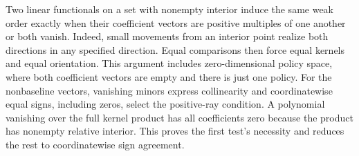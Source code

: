 \documentclass[11pt,a4paper]{amsart}
\begin{document}
Two linear functionals on a set with nonempty interior induce the same weak order exactly when their coefficient vectors are positive multiples of one another or both vanish. Indeed, small movements from an interior point realize both directions in any specified direction. Equal comparisons then force equal kernels and equal orientation. This argument includes zero-dimensional policy space, where both coefficient vectors are empty and there is just one policy. For the nonbaseline vectors, vanishing minors express collinearity and coordinatewise equal signs, including zeros, select the positive-ray condition. A polynomial vanishing over the full kernel product has all coefficients zero because the product has nonempty relative interior. This proves the first test's necessity and reduces the rest to coordinatewise sign agreement.
\end{document}
